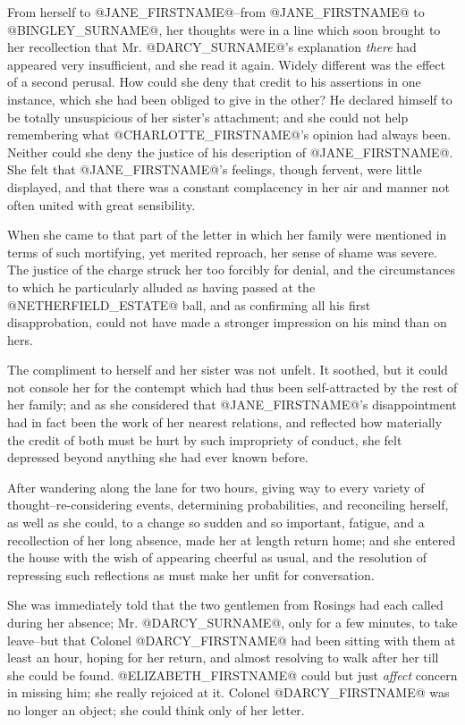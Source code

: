 From herself to @JANE_FIRSTNAME@--from @JANE_FIRSTNAME@ to @BINGLEY_SURNAME@, her thoughts were in a line
which soon brought to her recollection that Mr. @DARCY_SURNAME@'s explanation
\textit{there} had appeared very insufficient, and she read it again. Widely
different was the effect of a second perusal. How could she deny that
credit to his assertions in one instance, which she had been obliged to
give in the other? He declared himself to be totally unsuspicious of her
sister's attachment; and she could not help remembering what @CHARLOTTE_FIRSTNAME@'s
opinion had always been. Neither could she deny the justice of his
description of @JANE_FIRSTNAME@. She felt that @JANE_FIRSTNAME@'s feelings, though fervent, were
little displayed, and that there was a constant complacency in her air
and manner not often united with great sensibility.

When she came to that part of the letter in which her family were
mentioned in terms of such mortifying, yet merited reproach, her sense
of shame was severe. The justice of the charge struck her too forcibly
for denial, and the circumstances to which he particularly alluded as
having passed at the @NETHERFIELD_ESTATE@ ball, and as confirming all his first
disapprobation, could not have made a stronger impression on his mind
than on hers.

The compliment to herself and her sister was not unfelt. It soothed,
but it could not console her for the contempt which had thus been
self-attracted by the rest of her family; and as she considered
that @JANE_FIRSTNAME@'s disappointment had in fact been the work of her nearest
relations, and reflected how materially the credit of both must be hurt
by such impropriety of conduct, she felt depressed beyond anything she
had ever known before.

After wandering along the lane for two hours, giving way to every
variety of thought--re-considering events, determining probabilities,
and reconciling herself, as well as she could, to a change so sudden and
so important, fatigue, and a recollection of her long absence, made
her at length return home; and she entered the house with the wish
of appearing cheerful as usual, and the resolution of repressing such
reflections as must make her unfit for conversation.

She was immediately told that the two gentlemen from Rosings had each
called during her absence; Mr. @DARCY_SURNAME@, only for a few minutes, to take
leave--but that Colonel @DARCY_FIRSTNAME@ had been sitting with them at least
an hour, hoping for her return, and almost resolving to walk after her
till she could be found. @ELIZABETH_FIRSTNAME@ could but just \textit{affect} concern
in missing him; she really rejoiced at it. Colonel @DARCY_FIRSTNAME@ was no
longer an object; she could think only of her letter.



